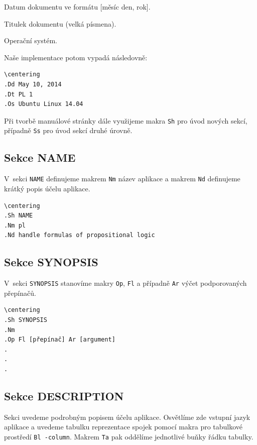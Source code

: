 \documentclass[thesis=B,czech,hidelinks]{thesis}[2012/06/26]
\begin{document}
\begin{description}
\centering
	\item[Dd] Datum dokumentu ve formátu [měsíc den, rok].
	\item[Dt] Titulek dokumentu (velká písmena).
	\item[Os] Operační systém.
\end{description}

Naše implementace potom vypadá následovně:

\begin{verbatim}
\centering
.Dd May 10, 2014
.Dt PL 1
.Os Ubuntu Linux 14.04
\end{verbatim}

Při tvorbě manuálové stránky dále využijeme makra \texttt{Sh} pro úvod nových sekcí, případně \texttt{Ss} pro úvod sekcí druhé úrovně.

\subsection{Sekce NAME}

V~sekci \texttt{NAME} definujeme makrem \texttt{Nm} název aplikace a makrem \texttt{Nd} definujeme krátký popis účelu aplikace.

\begin{verbatim}
\centering
.Sh NAME
.Nm pl
.Nd handle formulas of propositional logic
\end{verbatim}

\subsection{Sekce SYNOPSIS}

V~sekci \texttt{SYNOPSIS} stanovíme makry \texttt{Op}, \texttt{Fl} a případně \texttt{Ar} výčet podporovaných přepínačů.

\begin{verbatim}
\centering
.Sh SYNOPSIS
.Nm
.Op Fl [přepínač] Ar [argument]
.
.
.
\end{verbatim}

\subsection{Sekce DESCRIPTION}

Sekci uvedeme podrobným popisem účelu aplikace. Osvětlíme zde vstupní jazyk aplikace a uvedeme tabulku reprezentace spojek pomocí makra pro tabulkové prostředí \texttt{Bl -column}. Makrem \texttt{Ta} pak oddělíme jednotlivé buňky řádku tabulky.
\end{document}
